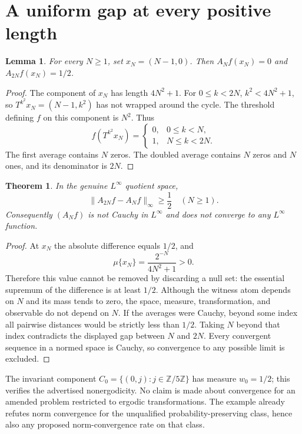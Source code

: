 \documentclass[11pt]{article}
\newtheorem{theorem}{Theorem}
\newtheorem{lemma}{Lemma}
\newcommand{\Z}{\mathbb Z}
\begin{document}
\section{A uniform gap at every positive length}
\begin{lemma}
For every $N\geq1$, set $x_N=(N-1,0)$. Then
$A_Nf(x_N)=0$ and $A_{2N}f(x_N)=1/2$.
\end{lemma}
\begin{proof}
The component of $x_N$ has length $4N^2+1$. For $0\leq k<2N$,
$k^2<4N^2+1$, so $T^{k^2}x_N=(N-1,k^2)$ has not wrapped around the cycle.
The threshold defining $f$ on this component is $N^2$. Thus
\[
 f(T^{k^2}x_N)=
 \begin{cases}
 0,&0\leq k<N,\\
 1,&N\leq k<2N.
 \end{cases}
\]
The first average contains $N$ zeros. The doubled average contains $N$ zeros
and $N$ ones, and its denominator is $2N$.
\end{proof}

\begin{theorem}
In the genuine $L^\infty$ quotient space,
\[
 \|A_{2N}f-A_Nf\|_\infty\geq\frac12\quad(N\geq1).
\]
Consequently $(A_Nf)$ is not Cauchy in $L^\infty$ and does not converge to any
$L^\infty$ function.
\end{theorem}
\begin{proof}
At $x_N$ the absolute difference equals $1/2$, and
\[
 \mu\{x_N\}=\frac{2^{-N}}{4N^2+1}>0.
\]
Therefore this value cannot be removed by discarding a null set: the essential
supremum of the difference is at least $1/2$. Although the witness atom depends
on $N$ and its mass tends to zero, the space, measure, transformation, and
observable do not depend on $N$.
If the averages were Cauchy, beyond some index all pairwise distances would
be strictly less than $1/2$. Taking $N$ beyond that index contradicts the displayed
gap between $N$ and $2N$. Every convergent sequence in a normed space is Cauchy,
so convergence to any possible limit is excluded.
\end{proof}

The invariant component $C_0=\{(0,j):j\in\Z/5\Z\}$ has measure $w_0=1/2$;
this verifies the advertised nonergodicity. No claim is made about convergence
for an amended problem restricted to ergodic transformations. The example
already refutes norm convergence for the unqualified probability-preserving
class, hence also any proposed norm-convergence rate on that class.

\clearpage
\end{document}
